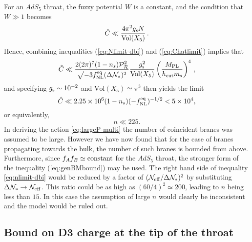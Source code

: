 For an $AdS_5$ throat, the fuzzy potential $W$ is a constant,
and the condition that $W \gg 1$ becomes 
% 
\begin{equation}
\label{eq:Chatlimit}
\hat{C} \ll \frac{4\pi^2g_\mathrm{s} N}{\mathrm{Vol}(X_5)} \,.
\end{equation}
% 
Hence, combining inequalities 
(\ref{eq:Nlimit-dbi}) and (\ref{eq:Chatlimit}) implies that
%  
\begin{equation}
\label{eq:nlimit-dbi}
\hat{C} \ll 
\frac{2 (2\pi)^7 (1-n_s)\mathcal{P}_{\mathcal{R}}^2 }{\sqrt{-3f_{\mathrm{NL}}^{\mathrm{eq}}} ( \Delta \mathcal{N}_*)^2}
\frac{g_\mathrm{s}^2}{\mathrm{Vol} (X_5) }
\left( \frac{M_{\mathrm{PL}}}{h_{\rm cut}m_\mathrm{s}} \right)^4  \,,
\end{equation}
% 
and specifying $g_\mathrm{s} \sim 10^{-2}$ and 
$\mathrm{Vol}(X_5) \simeq \pi^3$ then yields the limit  
% 
\begin{equation}
\hat{C} \ll 2.25\times 10^{6} (1-n_s)(-f_{\mathrm{NL}}^{\mathrm{eq}})^{-1/2} < 5\times 10^4,
\end{equation}
% 
 or equivalently,
%   
\begin{equation}
\label{eq:nbound-multi}
n \ll 225.
\end{equation}
% 
In deriving the action \eqref{eq:largeP-multi} the number of coincident branes was assumed to be
large. However we have now found that for the case of branes propagating towards the bulk, the
number of such branes is bounded from above.
Furthermore, since $f_Af_B \simeq {\rm constant}$ for the $AdS_5$ throat, 
the stronger form of the inequality (\ref{eq:genBMbound}) may be used. The right hand side of
inequality \eqref{eq:nlimit-dbi} would be reduced by a factor of $(   \mathcal{N}_\mathrm{eff} /\Delta \mathcal{N}_*)^2$ by
substituting 
$\Delta \mathcal{N}_* \rightarrow \mathcal{N}_\mathrm{eff}$. This ratio 
could be as high as $(60/4)^2 \simeq 200 $, leading to $n$ being less than $15$. In this case
the assumption of large $n$ would clearly be inconsistent and the model would be ruled out. 

\subsection{Bound on D3 charge at the tip of the throat}

